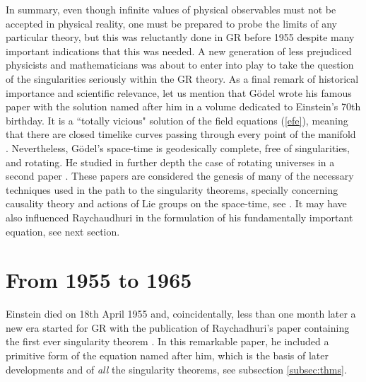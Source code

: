 \documentclass[12pt]{iopart}
\begin{document}
In summary, even though infinite values of 
physical observables must not be accepted in physical reality, one must be 
prepared to probe the limits of any particular theory, but this was reluctantly done in GR before 1955 despite many important indications that this was needed. A new generation of less prejudiced physicists and mathematicians 
was about to enter into play to take the question 
of the singularities seriously within the GR theory. As a final remark of historical importance and scientific relevance, let us mention that  G\"odel wrote his famous paper \cite{Go} with the solution named after him in a volume dedicated to 
Einstein's 70th birthday. It is a ``totally vicious" solution of the field equations (\ref{efe}), meaning that there are closed timelike curves passing through every point of the manifold \cite{Ca,S1}. Nevertheless, G\"odel's space-time is geodesically complete, free of singularities, and rotating. He studied in further depth the case of rotating universes in a second paper \cite{Go1}. These papers are considered 
\cite{TCE} the genesis of many of the necessary 
techniques used in the path to the singularity theorems, specially concerning causality theory and actions of Lie groups on the space-time, see \cite{Ell}. It may have also influenced Raychaudhuri in the formulation of his fundamentally important equation, see next section.


\section{From 1955 to 1965}\label{sec:history}
Einstein died on 18th April 1955 and, coincidentally, less than one month later a new era started for GR with the publication of Raychadhuri's paper containing the first ever singularity theorem \cite{Ray}. In this remarkable paper, he 
included a primitive form of the equation named after him,  which is the basis of later developments and of
{\em all} the singularity theorems, see subsection \ref{subsec:thms}. 
\end{document}
